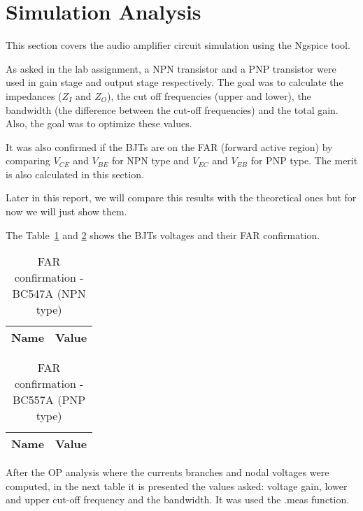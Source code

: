 \section{Simulation Analysis}
\label{sec:simulation}

\hspace{0,5cm} This section covers the audio amplifier circuit simulation using the Ngspice tool.
\par As asked in the lab assignment, a NPN transistor and a PNP transistor were used in gain stage and output stage respectively. The goal was to calculate the impedances ($Z_I$ and $Z_O$), the cut off frequencies (upper and lower), the bandwidth (the difference between the cut-off frequencies) and the total gain. Also, the goal was to optimize these values.
\par It was also confirmed if the BJTs are on the FAR (forward active region) by comparing $V_{CE}$ and $V_{BE}$ for NPN type and $V_{EC}$ and $V_{EB}$ for PNP type. The merit is also calculated in this section.
\par Later in this report, we will compare this results with the theoretical ones but for now we will just show them.

\par The Table~\ref{tab:ng2} and \ref{tab:ng3} shows the BJTs voltages and their FAR confirmation.

\begin{table}[!ht]
  \centering
  \begin{tabular}{|l|r|}
    \hline    
    {\bf Name} & {\bf Value } \\ \hline
    
  \end{tabular}
  \caption{FAR confirmation - BC547A (NPN type)}
  \label{tab:ng2}
\end{table}

\begin{table}[!ht]
  \centering
  \begin{tabular}{|l|r|}
    \hline    
    {\bf Name} & {\bf Value } \\ \hline
    
  \end{tabular}
  \caption{FAR confirmation - BC557A (PNP type)}
  \label{tab:ng3}
\end{table}

\par After the OP analysis where the currents branches and nodal voltages were computed, in the next table it is presented the values asked: voltage gain, lower and upper cut-off frequency and the bandwidth. It was used the .meas function.

